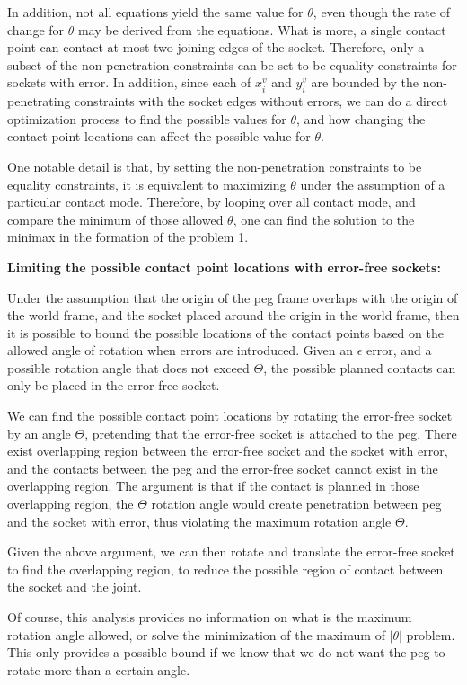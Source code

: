 \documentclass[11pt]{article}
\begin{document}
In addition, not all equations yield the same value for $\theta$, even though the rate of change for $\theta$ may be derived from the equations. What is more, a single contact point can contact at most two joining edges of the socket. Therefore, only a subset of the non-penetration constraints can be set to be equality constraints for sockets with error. In addition, since each of $x^v_i$ and $y^v_i$ are bounded by the non-penetrating constraints with the socket edges without errors, we can do a direct optimization process to find the possible values for $\theta$, and how changing the contact point locations can affect the possible value for $\theta$. 

One notable detail is that, by setting the non-penetration constraints to be equality constraints, it is equivalent to maximizing $\theta$ under the assumption of a particular contact mode. Therefore, by looping over all contact mode, and compare the minimum of those allowed $\theta$, one can find the solution to the minimax in the formation of the problem 1. 




\noindent\textbf{Limiting the possible contact point locations with error-free sockets: } 

Under the assumption that the origin of the peg frame overlaps with the origin of the world frame, and the socket placed around the origin in the world frame, then it is possible to bound the possible locations of the contact points based on the allowed angle of rotation when errors are introduced. Given an $\epsilon$ error, and a possible rotation angle that does not exceed $\Theta$, the possible planned contacts can only be placed in the error-free socket. 

We can find the possible contact point locations by rotating the error-free socket by an angle $\Theta$, pretending that the error-free socket is attached to the peg. There exist overlapping region between the error-free socket and the socket with error, and the contacts between the peg and the error-free socket cannot exist in the overlapping region. The argument is that if the contact is planned in those overlapping region, the $\Theta$ rotation angle would create penetration between peg and the socket with error, thus violating the maximum rotation angle $\Theta$. 

Given the above argument, we can then rotate and translate the error-free socket to find the overlapping region, to reduce the possible region of contact between the socket and the joint. 

Of course, this analysis provides no information on what is the maximum rotation angle allowed, or solve the minimization of the maximum of $|\theta|$ problem. This only provides a possible bound if we know that we do not want the peg to rotate more than a certain angle. 
\end{document}
